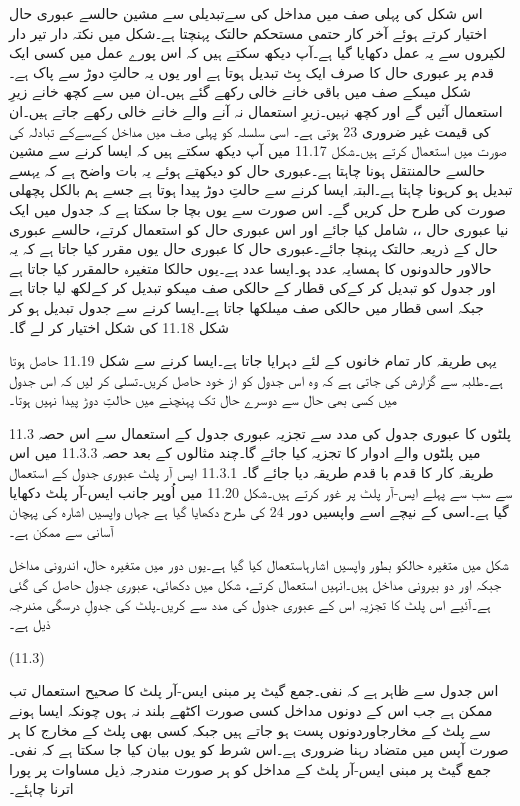 	اس شکل کی پہلی صف میں مداخل کی سےتبدیلی سے مشین حالسے عبوری حال اختیار کرتے ہوئے آخر کار حتمی مستحکم حالتک پہنچتا ہے۔شکل میں نکتہ دار تیر دار  لکیروں سے یہ عمل دکھایا گیا ہے۔آپ دیکھ سکتے ہیں کہ اس پورے عمل میں کسی ایک قدم پر عبوری حال  کا صرف ایک بِٹ تبدیل ہوتا ہے اور یوں یہ حالتِ دوڑ سے پاک ہے۔شکل میںکے صف میں باقی خانے خالی رکھے گئے ہیں۔ان میں سے کچھ خانے زیرِ استعمال آئیں گے اور کچھ نہیں۔زیرِ استعمال نہ آنے والے خانے خالی رکھے جاتے ہیں۔ان کی قیمت غیر ضروری 23 ہوتی ہے۔
	اسی سلسلہ کو پہلی صف میں مداخل کےسےکے تبادلہ کی صورت میں استعمال کرتے ہیں۔شکل 11.17 میں آپ دیکھ سکتے ہیں کہ ایسا کرنے سے مشین حالسے حالمنتقل ہونا چاہتا ہے۔عبوری حال  کو دیکھتے ہوئے یہ بات واضح ہے کہ یہسے تبدیل ہو کرہونا چاہتا ہے۔البتہ ایسا کرنے سے حالتِ دوڑ پیدا ہوتا ہے جسے ہم بالکل پچھلی صورت کی طرح حل کریں گے۔
	اس صورت سے یوں بچا جا سکتا ہے کہ جدول میں ایک نیا عبوری حال ،، شامل کیا جائے اور اس عبوری حال  کو استعمال کرتے، حالسے عبوری حال کے ذریعہ حالتک پہنچا جائے۔عبوری حال کا عبوری حال  یوں مقرر کیا جاتا ہے کہ یہ حالاور حالدونوں کا ہمسایہ عدد ہو۔ایسا عدد ہے۔یوں حالکا متغیرہ حالمقرر کیا جاتا ہے اور جدول کو تبدیل کر کےکی قطار کے حالکی صف میںکو تبدیل کر کےلکھ لیا جاتا ہے جبکہ اسی قطار میں حالکی صف میںلکھا جاتا ہے۔ایسا کرنے سے جدول تبدیل ہو کر شکل 11.18 کی شکل اختیار کر لے گا۔

	یہی طریقہ کار تمام خانوں کے لئے دہرایا جاتا ہے۔ایسا کرنے سے شکل 11.19 حاصل ہوتا ہے۔طلبہ سے گزارش کی جاتی ہے کہ وہ اس جدول کو از خود حاصل کریں۔تسلی کر لیں کہ اس جدول میں کسی بھی حال سے دوسرے حال تک پہنچنے میں حالتِ دوڑ پیدا نہیں ہوتا۔


11.3 پلٹوں کا عبوری جدول کی مدد سے تجزیہ
	عبوری جدول کے استعمال سے اس حصہ میں پلٹوں والے ادوار کا تجزیہ کیا جائے گا۔چند مثالوں کے بعد حصہ 11.3.3 میں اس طریقہ کار کا قدم با قدم طریقہ دیا جائے گا۔
11.3.1 ایس آر پلٹ
	عبوری جدول کے استعمال سے  سب سے پہلے ایس-آر پلٹ پر غور کرتے ہیں۔شکل 11.20 میں اُوپر جانب ایس-آر پلٹ دکھایا گیا ہے۔اسی کے نیچے اسے واپسیں دور 24 کی طرح دکھایا گیا ہے جہاں واپسیں اشارہ کی پہچان آسانی سے ممکن ہے۔


	شکل میں متغیرہ حالکو بطور واپسیں اشارہاستعمال کیا گیا ہے۔یوں دور میں متغیرہ حال، اندرونی مداخل جبکہ اور  دو بیرونی مداخل ہیں۔انہیں استعمال کرتے، شکل میں دکھائی، عبوری جدول حاصل کی گئی ہے۔آئیے اس پلٹ کا تجزیہ اس کے عبوری جدول کی مدد سے کریں۔پلٹ کی جدولِ درسگی مندرجہ ذیل ہے۔

 
(11.3)

	اس جدول سے ظاہر ہے کہ نفی۔جمع گیٹ پر مبنی ایس-آر پلٹ کا صحیح استعمال تب ممکن ہے جب اس کے دونوں مداخل کسی صورت اکٹھے بلند نہ ہوں چونکہ ایسا ہونے سے پلٹ کے مخارجاوردونوں پست ہو جاتے ہیں جبکہ کسی بھی پلٹ کے مخارج کا ہر صورت آپس میں متضاد رہنا ضروری ہے۔اس شرط کو یوں بیان کیا جا سکتا ہے کہ نفی۔جمع گیٹ پر مبنی ایس-آر پلٹ کے مداخل کو ہر صورت مندرجہ ذیل مساوات پر پورا اترنا چاہئے۔

